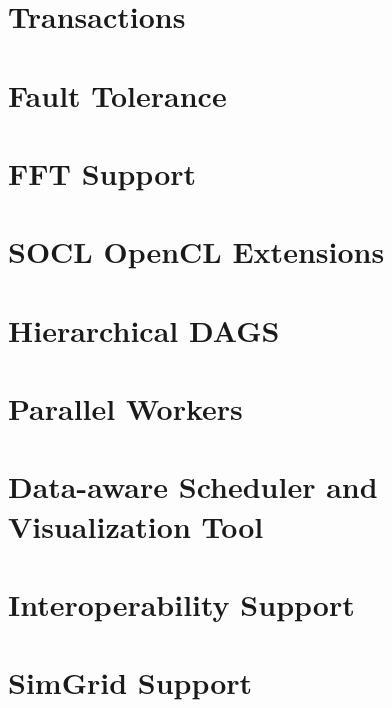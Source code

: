 \chapter{Transactions}
\label{Transactions}
\hypertarget{Transactions}{}


\chapter{Fault Tolerance}
\label{FaultTolerance}
\hypertarget{FaultTolerance}{}


\chapter{FFT Support}
\label{FFTSupport}
\hypertarget{FFTSupport}{}


\chapter{SOCL OpenCL Extensions}
\label{SOCLOpenclExtensions}
\hypertarget{SOCLOpenclExtensions}{}


\chapter{Hierarchical DAGS}
\label{HierarchicalDAGS}
\hypertarget{HierarchicalDAGS}{}


\chapter{Parallel Workers}
\label{ParallelWorker}
\hypertarget{ParallelWorker}{}


\chapter{Data-aware Scheduler and Visualization Tool}
\label{Darts}
\hypertarget{Darts}{}


\chapter{Interoperability Support}
\label{InteropSupport}
\hypertarget{InteropSupport}{}


\chapter{SimGrid Support}
\label{SimGridSupport}
\hypertarget{SimGridSupport}{}


